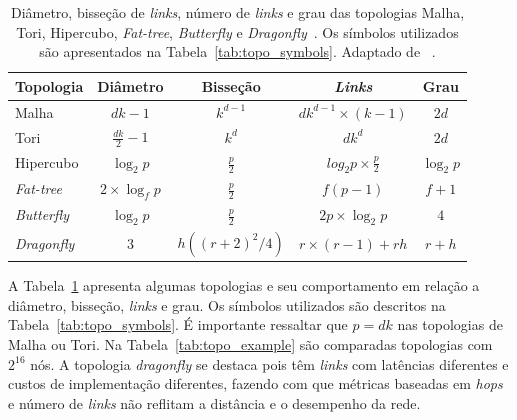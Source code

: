 \documentclass[
	12pt,				%
	openright,			%
	twoside,			%
	a4paper,			%
	english,			%
	brazil,				%
	]{abntex2}
\newcommand{\links}{\textit{links}\xspace}
\newcommand{\Links}{\textit{Links}\xspace}
\newcommand{\hops}{\textit{hops}\xspace}
\newcommand{\Fatt}{\textit{Fat-tree}\xspace}
\newcommand{\dgfly}{\textit{dragonfly}\xspace}
\newcommand{\Dgfly}{\textit{Dragonfly}\xspace}
\begin{document}
\setlength{\tabcolsep}{0.5em}
\begin{table}[!h]
    \centering
    \begin{tabular}{l c c c c}
        \toprule
        \textbf{Topologia} &    \textbf{Diâmetro} &  \textbf{Bisseção} &   \textbf{\Links} &     \textbf{Grau} \\ \midrule
        Malha & $dk-1$ & $k^{d-1}$ &   $dk^{d-1} \times (k-1)$ &    $2d$  \\ %
        Tori  & $\frac{dk}{2}-1$ & $k^d$ & $dk^d$ &  $2d$  \\ %
        Hipercubo &  $\log_2 p$ & $\frac{p}{2}$ &  $log_2 p \times \frac{p}{2}$  &  $\log_2 p$  \\ %
        \Fatt &  $2 \times \log_f p$ & $\frac{p}{2}$ & $f(p-1)$ &  $f + 1$  \\ %
        \textit{Butterfly} & $\log_2 p$ & $\frac{p}{2}$ &  $2p \times \log_2 p$ &  $4$  \\ %
        \Dgfly & $3$  & $h((r+2)^2/4) $  &  $ r\times(r-1) +rh  $ & $r + h$ \\\bottomrule
    \end{tabular}
    \caption[Diâmetro, bisseção de \links, número \links e grau das topologias de Malha, Tori, Hipercubo, \Fatt, \textit{Butterfly} e \Dgfly.]{Diâmetro, bisseção de \links, número de \links e grau das topologias Malha, Tori, Hipercubo, \Fatt, \textit{Butterfly} e \Dgfly~\cite{li:dgfly}. Os símbolos utilizados são apresentados na Tabela~\ref{tab:topo_symbols}. Adaptado de ~\cite{Solihin}.}
    \label{tab:topo_comparison}
\end{table}

A Tabela~\ref{tab:topo_comparison} apresenta algumas topologias e seu comportamento em relação a diâmetro, bisseção, \links e grau. Os símbolos utilizados são descritos na Tabela~\ref{tab:topo_symbols}.
É importante ressaltar que $p = dk$ nas topologias de Malha ou Tori.
Na Tabela~\ref{tab:topo_example} são comparadas topologias com $2^{16}$ nós.
A topologia \dgfly se destaca pois têm \links com latências diferentes e custos de implementação diferentes, fazendo com que métricas baseadas em \hops e número de \links não reflitam a distância e o desempenho da rede.
\end{document}
